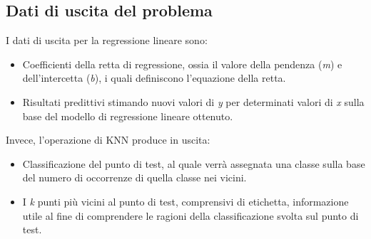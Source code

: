 \documentclass[11pt]{article}
\theoremstyle{definition}
\begin{document}
\subsection{Dati di uscita del problema}
I dati di uscita per la regressione lineare sono:
\begin{itemize}
\item Coefficienti della retta di regressione, ossia il valore della pendenza (\textit{m}) e dell'intercetta (\textit{b}), i quali definiscono l'equazione della retta.
\item Risultati predittivi stimando nuovi valori di \textit{y} per determinati valori di \textit{x} sulla base del modello di regressione lineare ottenuto.
\end{itemize}
Invece, l'operazione di KNN produce in uscita:
\begin{itemize}
\item Classificazione del punto di test, al quale verrà assegnata una classe sulla base del numero di occorrenze di quella classe nei vicini.
\item I \textit{k} punti più vicini al punto di test, comprensivi di etichetta, informazione utile al fine di comprendere le ragioni della classificazione svolta sul punto di test.
\end{itemize}
\end{document}

